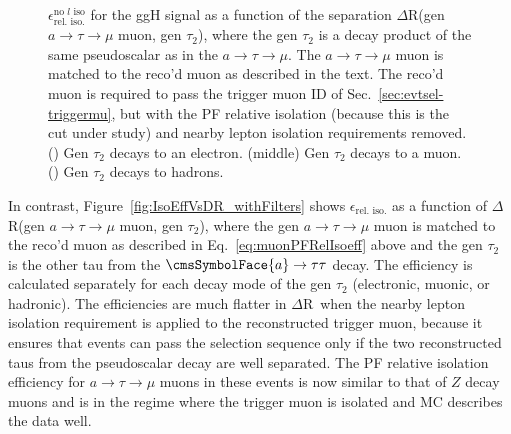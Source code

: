 \begin{figure}[hbtp]
\begin{center}
    \caption{$\epsilon_{\text{rel. iso.}}^{\text{no }l\text{ iso}}$ for the ggH signal as a function of the separation $\Delta$R(gen $a\rightarrow\tau\rightarrow\mu$ muon, gen $\tau_{\text{2}}$), where the gen $\tau_{\text{2}}$ is a decay product of the same pseudoscalar as in the $a\rightarrow\tau\rightarrow\mu$.  The $a\rightarrow\tau\rightarrow\mu$ muon is matched to the reco'd muon as described in the text.  The reco'd muon is required to pass the trigger muon ID of Sec.~\ref{sec:evtsel-triggermu}, but with the PF relative isolation (because this is the cut under study) and nearby lepton isolation requirements removed.  (\cmsLeft) Gen $\tau_{\text{2}}$ decays to an electron.  (middle) Gen $\tau_{\text{2}}$ decays to a muon.  (\cmsRight) Gen $\tau_{\text{2}}$ decays to hadrons.}
    \label{fig:IsoEffVsDR}
  \end{center}
\end{figure}

In contrast, Figure~\ref{fig:IsoEffVsDR_withFilters} shows $\epsilon_{\text{rel. iso.}}$ as a function of $\Delta$R(gen $a\rightarrow\tau\rightarrow\mu$ muon, gen $\tau_{\text{2}}$), where the gen $a\rightarrow\tau\rightarrow\mu$ muon is matched to the reco'd muon as described in Eq.~\ref{eq:muonPFRelIsoeff} above and the gen $\tau_{\text{2}}$ is the other tau from the $\cmsSymbolFace{a}\rightarrow\tau\tau$ decay.  The efficiency is calculated separately for each decay mode of the gen $\tau_{\text{2}}$ (electronic, muonic, or hadronic).  The efficiencies are much flatter in $\Delta$R\ when the nearby lepton isolation requirement is applied to the reconstructed trigger muon, because it ensures that events can pass the selection sequence only if the two reconstructed taus from the pseudoscalar decay are well separated.  The PF relative isolation efficiency for $a\rightarrow\tau\rightarrow\mu$ muons in these events is now similar to that of $Z$ decay muons and is in the regime where the trigger muon is isolated and MC describes the data well.

